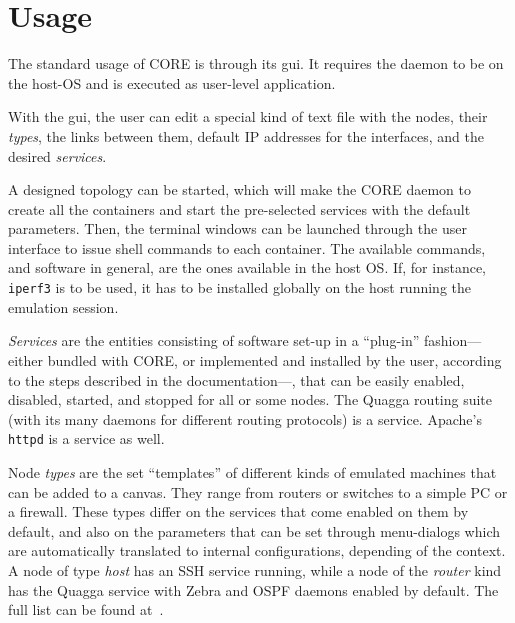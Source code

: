 \section{Usage}
\label{sec:coreusage}

The standard usage of CORE is through its \gls{gui}.
It requires the daemon to be on the host-OS and is executed as user-level application.

With the \gls{gui}, the user can edit a special kind of text file with the nodes, their \emph{types}, the links between them, default IP addresses for the interfaces, and the desired \emph{services}.

A designed topology can be started, which will make the CORE daemon to create all the containers and start the pre-selected services with the default parameters.
Then, the terminal windows can be launched through the user interface to issue shell commands to each container.
The available commands, and software in general, are the ones available in the host OS.
If, for instance, \texttt{iperf3} is to be used, it has to be installed globally on the host running the emulation session.

\emph{Services} are the entities consisting of software set-up in a ``plug-in'' fashion---either bundled with CORE, or implemented and installed by the user, according to the steps described in the documentation---, that can be easily enabled, disabled, started, and stopped for all or some nodes.
The Quagga routing suite (with its many daemons for different routing protocols) is a service. Apache's \texttt{httpd} is a service as well.

Node \emph{types} are the set ``templates'' of different kinds of emulated machines that can be added to a canvas. They range from routers or switches to a simple PC or a firewall.
These types differ on the services that come enabled on them by default, and also on the parameters that can be set through menu-dialogs which are automatically translated to internal configurations, depending of the context.
A node of type \emph{host} has an SSH service running, while a node of the \emph{router} kind has the Quagga service with Zebra and OSPF daemons enabled by default.
The full list can be found at~\cite{coreghdocs}.

